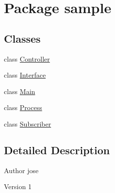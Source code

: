 \hypertarget{namespacesample}{}\section{Package sample}
\label{namespacesample}
\subsection*{Classes}
\begin{DoxyCompactItemize}
\item 
class \mbox{\hyperlink{classsample_1_1_controller}{Controller}}
\item 
class \mbox{\hyperlink{classsample_1_1_interface}{Interface}}
\item 
class \mbox{\hyperlink{classsample_1_1_main}{Main}}
\item 
class \mbox{\hyperlink{classsample_1_1_process}{Process}}
\item 
class \mbox{\hyperlink{classsample_1_1_subscriber}{Subscriber}}
\end{DoxyCompactItemize}


\subsection{Detailed Description}
\begin{DoxyAuthor}{Author}
jose 
\end{DoxyAuthor}
\begin{DoxyVersion}{Version}
1 
\end{DoxyVersion}
